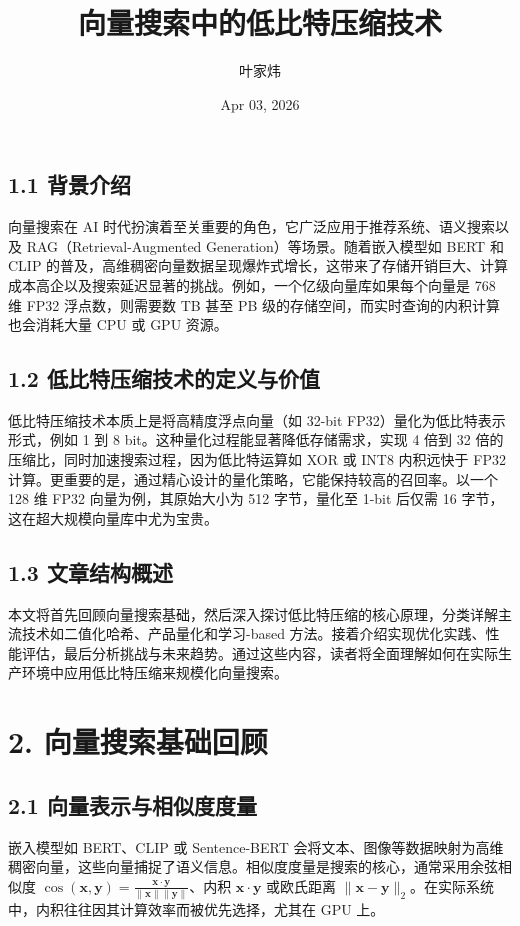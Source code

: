 \title{向量搜索中的低比特压缩技术}
\author{叶家炜}
\date{Apr 03, 2026}
\maketitle
\section{1.1 背景介绍}
向量搜索在 AI 时代扮演着至关重要的角色，它广泛应用于推荐系统、语义搜索以及 RAG（Retrieval-Augmented Generation）等场景。随着嵌入模型如 BERT 和 CLIP 的普及，高维稠密向量数据呈现爆炸式增长，这带来了存储开销巨大、计算成本高企以及搜索延迟显著的挑战。例如，一个亿级向量库如果每个向量是 768 维 FP32 浮点数，则需要数 TB 甚至 PB 级的存储空间，而实时查询的内积计算也会消耗大量 CPU 或 GPU 资源。\par
\section{1.2 低比特压缩技术的定义与价值}
低比特压缩技术本质上是将高精度浮点向量（如 32-bit FP32）量化为低比特表示形式，例如 1 到 8 bit。这种量化过程能显著降低存储需求，实现 4 倍到 32 倍的压缩比，同时加速搜索过程，因为低比特运算如 XOR 或 INT8 内积远快于 FP32 计算。更重要的是，通过精心设计的量化策略，它能保持较高的召回率。以一个 128 维 FP32 向量为例，其原始大小为 512 字节，量化至 1-bit 后仅需 16 字节，这在超大规模向量库中尤为宝贵。\par
\section{1.3 文章结构概述}
本文将首先回顾向量搜索基础，然后深入探讨低比特压缩的核心原理，分类详解主流技术如二值化哈希、产品量化和学习-based 方法。接着介绍实现优化实践、性能评估，最后分析挑战与未来趋势。通过这些内容，读者将全面理解如何在实际生产环境中应用低比特压缩来规模化向量搜索。\par
\chapter{2. 向量搜索基础回顾}
\section{2.1 向量表示与相似度度量}
嵌入模型如 BERT、CLIP 或 Sentence-BERT 会将文本、图像等数据映射为高维稠密向量，这些向量捕捉了语义信息。相似度度量是搜索的核心，通常采用余弦相似度 $\cos(\mathbf{x}, \mathbf{y}) = \frac{\mathbf{x} \cdot \mathbf{y}}{\|\mathbf{x}\| \|\mathbf{y}\|}$、内积 $\mathbf{x} \cdot \mathbf{y}$ 或欧氏距离 $\|\mathbf{x} - \mathbf{y}\|_2$。在实际系统中，内积往往因其计算效率而被优先选择，尤其在 GPU 上。\par
